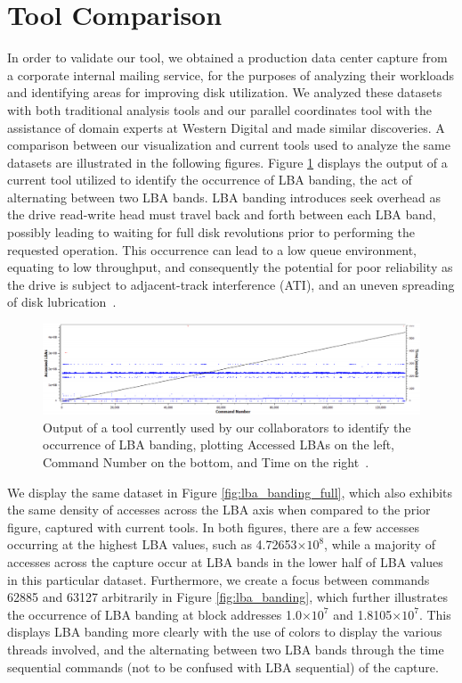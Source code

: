\documentclass[12pt]{ucthesis}
\providecommand{\e}[1]{\ensuremath{\times 10^{#1}}}
\begin{document}
\clearpage

\section{Tool Comparison}
In order to validate our tool, we obtained a production data center capture from a corporate internal mailing service, for the purposes of analyzing their workloads and identifying areas for improving disk utilization. We analyzed these datasets with both traditional analysis tools and our parallel coordinates tool with the assistance of domain experts at Western Digital and made similar discoveries. A comparison between our visualization and current tools used to analyze the same datasets are illustrated in the following figures. Figure \ref{fig:prev_tool} displays the output of a current tool utilized to identify the occurrence of LBA banding, the act of alternating between two LBA bands. LBA banding introduces seek overhead as the drive read-write head must travel back and forth between each LBA band, possibly leading to waiting for full disk revolutions prior to performing the requested operation. This occurrence can lead to a low queue environment, equating to low throughput, and consequently the potential for poor reliability as the drive is subject to adjacent-track interference (ATI), and an uneven spreading of disk lubrication~\cite{internal:collab}. 

\begin{figure}[h!]
 \centering
 \includegraphics[width=\textwidth]{images/prev_tool.jpg}
 \caption[Output of a tool currently used to identify LBA banding.]{Output of a tool currently used by our collaborators to identify the occurrence of LBA banding, plotting Accessed LBAs on the left, Command Number on the bottom, and Time on the right~\cite{internal:collab}.}
 \label{fig:prev_tool}
\end{figure}

We display the same dataset in Figure \ref{fig:lba_banding_full}, which also exhibits the same density of accesses across the LBA axis when compared to the prior figure, captured with current tools. In both figures, there are a few accesses occurring at the highest LBA values, such as 4.72653\e{8}, while a majority of accesses across the capture occur at LBA bands in the lower half of LBA values in this particular dataset. Furthermore, we create a focus between commands 62885 and 63127 arbitrarily in Figure \ref{fig:lba_banding}, which further illustrates the occurrence of LBA banding at block addresses 1.0\e{7} and 1.8105\e{7}. This displays LBA banding more clearly with the use of colors to display the various threads involved, and the alternating between two LBA bands through the time sequential commands (not to be confused with LBA sequential) of the capture. 
\end{document}
